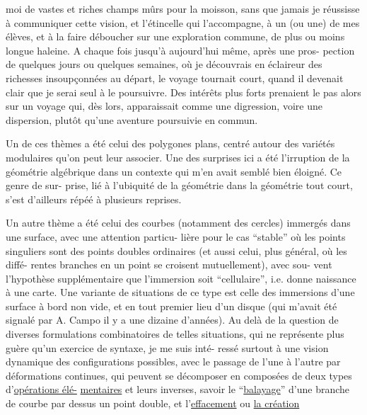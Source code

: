
moi de vastes et riches champs mûrs pour la moisson, sans que
jamais je réussisse à communiquer cette vision, et l'étincelle
qui l'accompagne, à un (ou une) de mes élèves, et à la faire
déboucher sur une exploration commune, de plus ou moins longue
haleine. A chaque fois jusqu'à aujourd'hui même, après une pros-%
pection de quelques jours ou quelques semaines, où je découvrais
en éclaireur des richesses insoupçonnées au départ, le voyage
tournait court, quand il devenait clair que je serai seul à le
poursuivre. Des intérêts plus forts prenaient le pas alors sur
un voyage qui, dès lors, apparaissait comme une digression, voire
une dispersion, plutôt qu'une aventure poursuivie en commun.

Un de ces thèmes a été celui des polygones plans, centré
autour des variétés modulaires qu'on peut leur associer. Une des
surprises ici a été l'irruption de la géométrie algébrique dans
un contexte qui m'en avait semblé bien éloigné. Ce genre de sur-%
prise, lié à l'ubiquité de la géométrie  dans la géométrie tout
court, s'est d'ailleurs répéé à plusieurs reprises.

Un autre thème a été celui des courbes (notamment des
cercles) immergés dans une surface, avec une attention particu-%
lière pour le cas ``stable'' où les points singuliers sont des points
doubles ordinaires (et aussi celui, plus général, où les diffé-%
rentes branches en un point se croisent mutuellement), avec sou-%
vent l'hypothèse supplémentaire que l'immersion soit ``cellulaire'',
i.e. donne naissance à une carte. Une variante de situations de
ce type est celle des immersions d'une surface à bord non vide,
et en tout premier lieu d'un disque (qui m'avait été signalé par
A. Campo il y a une dizaine d'années). Au delà de la question de
diverses formulations combinatoires de telles situations, qui ne
représente plus guère qu'un exercice de syntaxe, je me suis inté-%
ressé surtout à une vision dynamique des configurations possibles,
avec le passage de l'une à l'autre par déformations continues, qui
peuvent se décomposer en composées de deux types d'\uline{opérations élé-}%
\uline{mentaires} et leurs inverses, savoir le ``\uline{balayage}'' d'une branche
de courbe par dessus un point double, et l'\uline{effacement} ou \uline{la création}

